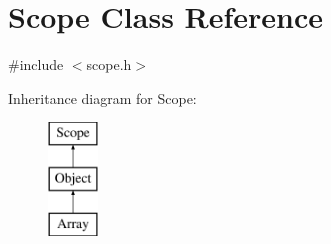 \hypertarget{classScope}{}\section{Scope Class Reference}
\label{classScope}


{\ttfamily \#include $<$scope.\+h$>$}

Inheritance diagram for Scope\+:\begin{figure}[H]
\begin{center}
\leavevmode
\includegraphics[height=3.000000cm]{classScope}
\end{center}
\end{figure}
